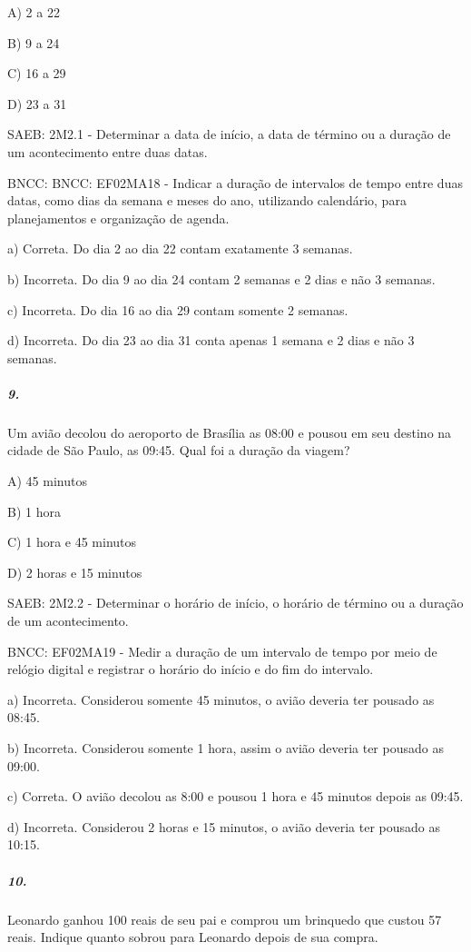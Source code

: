 A) 2 a 22

B) 9 a 24

C) 16 a 29

D) 23 a 31

SAEB: 2M2.1 - Determinar a data de início, a data de término ou a
duração de um acontecimento entre duas datas.

BNCC: BNCC: EF02MA18 - Indicar a duração de intervalos de tempo entre
duas datas, como dias da semana e meses do ano, utilizando calendário,
para planejamentos e organização de agenda.

a) Correta. Do dia 2 ao dia 22 contam exatamente 3 semanas.

b) Incorreta. Do dia 9 ao dia 24 contam 2 semanas e 2 dias e não 3
semanas.

c) Incorreta. Do dia 16 ao dia 29 contam somente 2 semanas.

d) Incorreta. Do dia 23 ao dia 31 conta apenas 1 semana e 2 dias e não 3
semanas.

\subparagraph{9. }\label{section-123}

Um avião decolou do aeroporto de Brasília as 08:00 e pousou em seu
destino na cidade de São Paulo, as 09:45. Qual foi a duração da viagem?

A) 45 minutos

B) 1 hora

C) 1 hora e 45 minutos

D) 2 horas e 15 minutos

SAEB: 2M2.2 - Determinar o horário de início, o horário de término ou a
duração de um acontecimento.

BNCC: EF02MA19 - Medir a duração de um intervalo de tempo por meio de
relógio digital e registrar o horário do início e do fim do intervalo.

a) Incorreta. Considerou somente 45 minutos, o avião deveria ter pousado
as 08:45.

b) Incorreta. Considerou somente 1 hora, assim o avião deveria ter
pousado as 09:00.

c) Correta. O avião decolou as 8:00 e pousou 1 hora e 45 minutos depois
as 09:45.

d) Incorreta. Considerou 2 horas e 15 minutos, o avião deveria ter
pousado as 10:15.

\subparagraph{10. }\label{section-124}

Leonardo ganhou 100 reais de seu pai e comprou um brinquedo que custou
57 reais. Indique quanto sobrou para Leonardo depois de sua compra.

